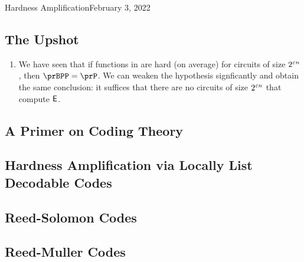 \begin{lecture}{3}{Hardness Amplification}{February 3, 2022}
\label{lec:03}

\subsection*{The Upshot}

\begin{enumerate}
  \item We have seen that if functions in \E are hard (on average) for circuits
    of size $2^{\varepsilon n}$, then $\prBPP = \prP$. We can weaken the hypothesis
    signficantly and obtain the same conclusion: it suffices that there are
    no circuits of size $2^{\varepsilon n}$ that compute $\textsf{E}$.
\end{enumerate}
  

\subsection{A Primer on Coding Theory}

\subsection{Hardness Amplification via Locally List Decodable Codes}

\subsection{Reed-Solomon Codes}

\subsection{Reed-Muller Codes}

\end{lecture}
